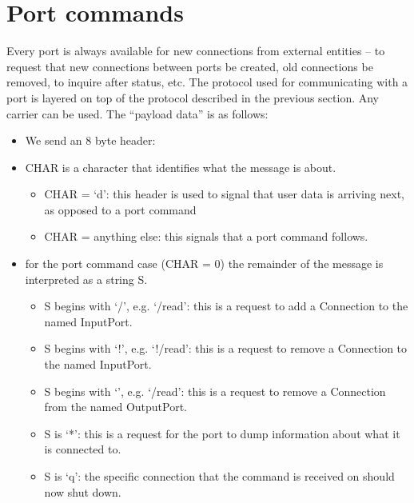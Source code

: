 \documentclass[a4]{article}
\newcommand{\twiddle}{\char126}
\newcommand{\packet}[1]{\framebox{#1}}
\begin{document}
\section{Port commands}

Every port is always available for new connections from external
entities -- to request that new connections between ports be created,
old connections be removed, to inquire after status, etc.
%
The protocol used for communicating with a port is layered on top of the
protocol described in the previous section.  Any carrier can be used.
The ``payload data'' is as follows:

\begin{itemize}

\item We send an 8 byte header: \packet{0,0,0,0, `\twiddle', CHAR, 0, 1.}

\item CHAR is a character that identifies what the message is about.

  \begin{itemize}
    
  \item CHAR = `d': this header is used to signal that user data is
  arriving next, as opposed to a port command
    
  \item CHAR = anything else: this signals that a port command
    follows.

  \end{itemize}

\item for the port command case (CHAR = 0) the remainder of the message 
  is interpreted as a string S.

  \begin{itemize}
   \item S begins with `/', e.g. `/read': this is a request to add a
   Connection to the named InputPort.

   \item S begins with `!', e.g. `!/read': this is a request to remove
   a Connection to the named InputPort.

   \item S begins with `\twiddle', e.g. `\twiddle/read': this is a
   request to remove a Connection from the named OutputPort.

   \item S is `*': this is a request for the port to dump information
     about what it is connected to.

   \item S is `q': the specific connection that the command is received on
   should now shut down.
  \end{itemize}

\end{itemize}
\end{document}

